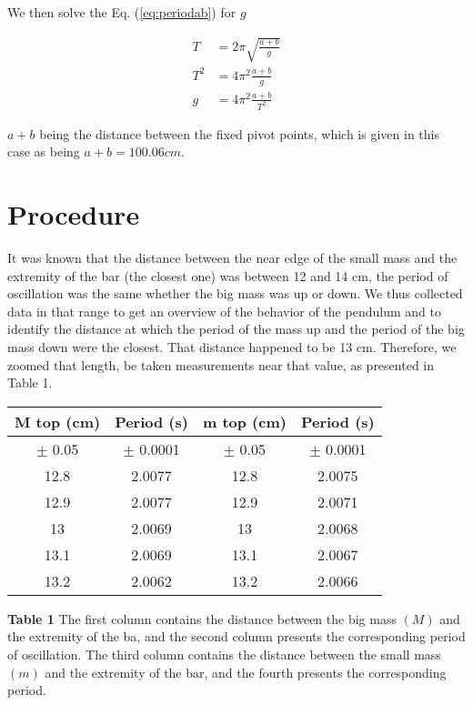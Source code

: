 \documentclass[12pt]{article}
\begin{document}
We then solve the Eq. (\ref{eq:periodab}) for $g$

\begin{equation}
    \begin{aligned}
        T&=2\pi \sqrt{\frac{a+b}{ g }} \\
        T^2&=4\pi^2 \frac{a+b}{ g } \\
        g&=4\pi^2\frac{ a+b }{ T^2 } \label{eq:final}
    \end{aligned}
\end{equation}

$a+b$ being the distance between the fixed pivot points, which is given in this case as being $a+b=100.06cm$.
\newpage
\section*{Procedure}
It was known that the distance between the near edge of the small mass and the extremity of the bar (the closest one) was between 12 and 14 cm, the period of oscillation was the same whether the big mass was up or down. We thus collected data in that range to get an overview of the behavior of the pendulum and to identify the distance at which the period of the mass up and the period of the big mass down were the closest. That distance happened to be 13 cm. Therefore, we zoomed that length, be taken measurements near that value, as presented in Table 1. 


\begin{center}
    \begin{threeparttable}\label{tab:periods}
        \begin{tabular}{|c| c | c | c |}
            \hline
        M top (cm) & Period (s) & m top (cm) & Period (s) \\ \hline 
        $\pm$ 0.05 &$\pm$ 0.0001 & $\pm$ 0.05 & $\pm$ 0.0001 \\ \hline
        12.8       & 2.0077 & 12.8 &2.0075 \\ \hline
        12.9       & 2.0077 & 12.9 &2.0071 \\ \hline
        13         & 2.0069 & 13   &2.0068 \\ \hline
        13.1       & 2.0069 & 13.1 &2.0067 \\ \hline
        13.2       & 2.0062 & 13.2 &2.0066 \\ \hline
    \end{tabular}

    \begin{tablenotes}
    \item \footnotesize \textbf{Table 1} The first column contains the distance between the big mass $(M)$ and the extremity of the ba, and the second column presents the corresponding period of oscillation. The third column contains the distance between the small mass $(m)$ and the extremity of the bar, and the fourth presents the corresponding period.  
    \end{tablenotes}
\end{threeparttable}
\end{center}
\end{document}
